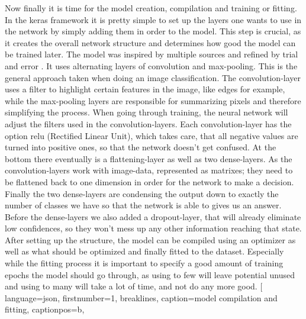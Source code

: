 

Now finally it is time for the model creation, compilation and training or
fitting. In the keras framework it is pretty simple to set up the layers one
wants to use in the network by simply adding them in order to the model. This
step is crucial, as it creates the overall network structure and determines how
good the model can be trained later. 
\newline
The model was inspired by multiple sources and refined by trial and error
\cite{Prakash2020}. 
It uses alternating layers of convolution and max-pooling. This is the general
approach taken when doing an image classification. The convolution-layer uses a
filter to highlight certain features in the image, like edges for example, while
the max-pooling layers are responsible for summarizing pixels and therefore
simplifying the process. When going through training, the neural network will
adjust the filters used in the convolution-layers. Each convolution-layer has
the option relu (Rectified Linear Unit), which takes care, that all negative
values are turned into positive ones, so that the network doesn't get confused.
At the bottom there eventually is a flattening-layer as well as two
dense-layers. As the convolution-layers work with image-data, represented as
matrixes; they need to be flattened back to one dimension in order for the
network to make a decision. Finally the two dense-layers are condensing the
output down to exactly the number of classes we have so that the network is able
to gives us an answer. Before the dense-layers we also added a
dropout-layer, that will already eliminate low confidences, so they won't mess
up any other information reaching that state.
\newline
After setting up the structure, the model can be compiled using an optimizer as
well as what should be optimized and finally fitted to the dataset. Especially
while the fitting process it is important to specify a good amount of training
epochs the model should go through, as using to few will leave potential unused
and using to many will take a lot of time, and not do any more good.
[
    language=json,
    firstnumber=1,
    breaklines,
    caption={model compilation and fitting},
    captionpos=b, 

